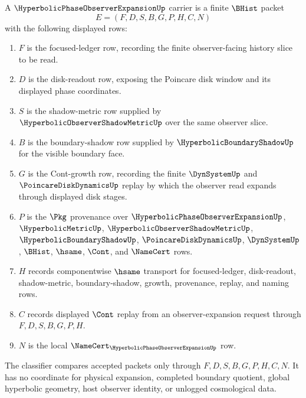 \begin{definition}
\label{def:hyperbolic-phase-observer-expansion-carrier}
A $\HyperbolicPhaseObserverExpansionUp$ carrier is a finite $\BHist$ packet
$$
E=(F,D,S,B,G,P,H,C,N)
$$
with the following displayed rows:
\begin{enumerate}
\item $F$ is the focused-ledger row, recording the finite observer-facing history slice to be read.
\item $D$ is the disk-readout row, exposing the Poincare disk window and its displayed phase coordinates.
\item $S$ is the shadow-metric row supplied by $\HyperbolicObserverShadowMetricUp$ over the same observer slice.
\item $B$ is the boundary-shadow row supplied by $\HyperbolicBoundaryShadowUp$ for the visible boundary face.
\item $G$ is the Cont-growth row, recording the finite $\DynSystemUp$ and $\PoincareDiskDynamicsUp$ replay by which the observer read expands through displayed disk stages.
\item $P$ is the $\Pkg$ provenance over $\HyperbolicPhaseObserverExpansionUp$, $\HyperbolicMetricUp$, $\HyperbolicObserverShadowMetricUp$, $\HyperbolicBoundaryShadowUp$, $\PoincareDiskDynamicsUp$, $\DynSystemUp$, $\BHist$, $\hsame$, $\Cont$, and $\NameCert$ rows.
\item $H$ records componentwise $\hsame$ transport for focused-ledger, disk-readout, shadow-metric, boundary-shadow, growth, provenance, replay, and naming rows.
\item $C$ records displayed $\Cont$ replay from an observer-expansion request through $F,D,S,B,G,P,H$.
\item $N$ is the local $\NameCert_{\HyperbolicPhaseObserverExpansionUp}$ row.
\end{enumerate}
The classifier compares accepted packets only through $F,D,S,B,G,P,H,C,N$. It has no coordinate for physical expansion, completed boundary quotient, global hyperbolic geometry, host observer identity, or unlogged cosmological data.
\end{definition}


